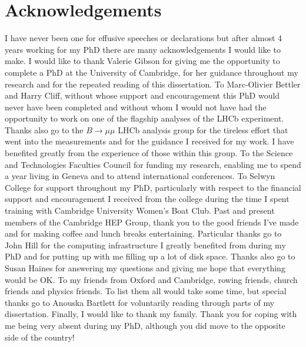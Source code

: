




\chapter{Acknowledgements}

I have never been one for effusive speeches or declarations but after almost 4 years working for my PhD there are many acknowledgements I would like to make. %
I would like to thank Valerie Gibson for giving me the opportunity to complete a PhD at the University of Cambridge, for her guidance throughout my research and for the repeated reading of this dissertation. %
To Marc-Olivier Bettler and Harry Cliff, without whose support and encouragement this PhD would never have been completed and without whom I would not have had the opportunity to work on one of the flagship analyses of the LHCb experiment.
Thanks also go to the $B \to \mu\mu$ LHCb analysis group for the tireless effort that went into the \BF measurements and for the guidance I received for my work. I have benefited greatly from the experience of those within this group. 
To the Science and Technologies Faculties Council for funding my research, enabling me to spend a year living in Geneva and to attend international conferences. To Selwyn College for support throughout my PhD, particularly with respect to the financial support and encouragement I received from the college during the time I spent training with Cambridge University Women's Boat Club. %
Past and present members of the Cambridge HEP Group, thank you to the good friends I've made and for making coffee and lunch breaks entertaining. Particular thanks go to John Hill for the computing infrastructure I greatly benefited from during my PhD and for putting up with me filling up a lot of disk space. Thanks also go to Susan Haines for answering my questions and giving me hope that everything would be OK. 
To my friends from Oxford and Cambridge, rowing friends, church friends and physics friends. To list them all would take some time, but special thanks go to Anouska Bartlett for voluntarily reading through parts of my dissertation. %
Finally, I would like to thank my family. Thank you for coping with me being very absent during my PhD, although you did move to the opposite side of the country! 

